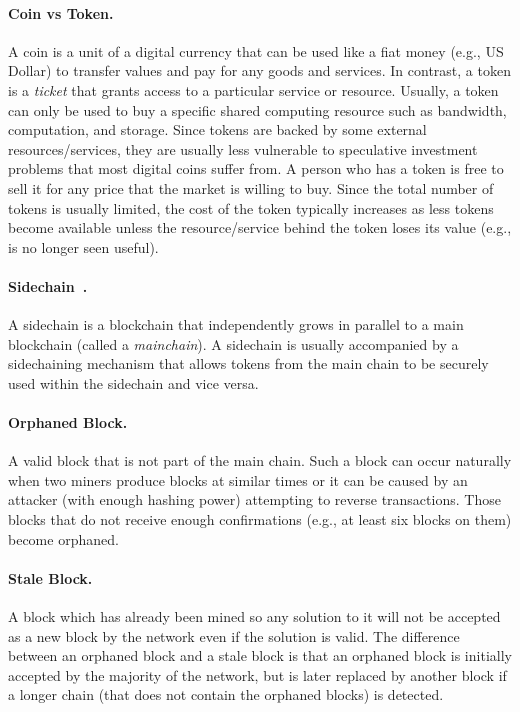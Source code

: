 \documentclass[11pt]{article}
\theoremstyle{mytheoremstyle}
\begin{document}
\paragraph{Coin vs Token.} A coin is a unit of a digital currency that can be used like a fiat money (e.g., US Dollar) to transfer values and pay for any goods and services. In contrast, a token is a \emph{ticket} that grants access to a particular service or resource. Usually, a token can only be used to buy a specific shared computing resource such as bandwidth, computation, and storage. Since tokens are backed by some external resources/services, they are usually less vulnerable to speculative investment problems that most digital coins suffer from. A person who has a token is free to sell it for any price that the market is willing to buy. Since the total number of tokens is usually limited, the cost of the token typically increases as less tokens become available unless the resource/service behind the token loses its value (e.g., is no longer seen useful).

\paragraph{Sidechain~\cite{sidechains:2014}.} A sidechain is a blockchain that independently grows in parallel to a main blockchain (called a \emph{mainchain}). A sidechain is usually accompanied by a sidechaining mechanism that allows tokens from the main chain to be securely used within the sidechain and vice versa.

\paragraph{Orphaned Block.} A valid block that is not part of the main chain. Such a block can occur naturally when two miners produce blocks at similar times or it can be caused by an attacker (with enough hashing power) attempting to reverse transactions. Those blocks that do not receive enough confirmations (e.g., at least six blocks on them) become orphaned.

\paragraph{Stale Block.} A block which has already been mined so any solution to it will not be accepted as a new block by the network even if the solution is valid. The difference between an orphaned block and a stale block is that an orphaned block is initially accepted by the majority of the network, but is later replaced by another block if a longer chain (that does not contain the orphaned blocks) is detected.
\end{document}
